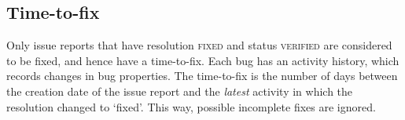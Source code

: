 \subsection{Time-to-fix} %
\label{sub:time_to_fix}
Only issue reports that have resolution \textsc{fixed} and status \textsc{verified} are considered to be fixed, and hence have a time-to-fix. Each bug has an activity history, which records changes in bug properties. The time-to-fix is the number of days between the creation date of the issue report and the \emph{latest} activity in which the resolution changed to `fixed'. This way, possible incomplete fixes are ignored.

